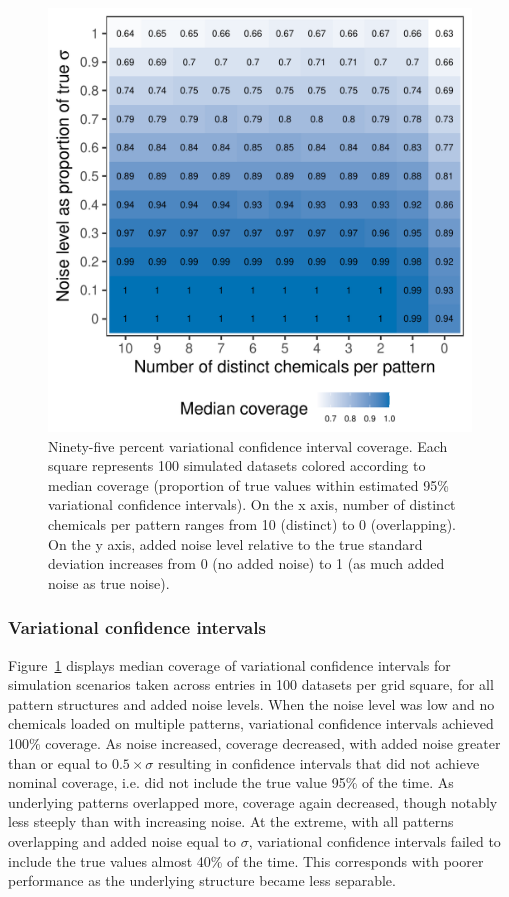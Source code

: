 \begin{figure}[!htbp]
\caption[Variational confidence interval coverage]{Ninety-five percent variational confidence interval coverage. Each square represents 100 simulated datasets colored according to median coverage (proportion of true values within estimated 95\% variational confidence intervals). On the x axis, number of distinct chemicals per pattern ranges from 10 (distinct) to 0 (overlapping). On the y axis, added noise level relative to the true standard deviation increases from 0 (no added noise) to 1 (as much added noise as true noise).}
\label{heatmap}
\centering
\includegraphics[scale = 0.7]{./figures/coverage_heat.pdf}
\end{figure}

\subsubsection{Variational confidence intervals}
Figure~\ref{heatmap} displays median coverage of variational confidence intervals for simulation scenarios taken across entries in 100 datasets per grid square, for all pattern structures and added noise levels. When the noise level was low and no chemicals loaded on multiple patterns, variational confidence intervals achieved 100\% coverage. As noise increased, coverage decreased, with added noise greater than or equal to $0.5 \times \sigma$ resulting in confidence intervals that did not achieve nominal coverage, i.e. did not include the true value 95\% of the time. As underlying patterns overlapped more, coverage again decreased, though notably less steeply than with increasing noise. At the extreme, with all patterns overlapping and added noise equal to $\sigma$, variational confidence intervals failed to include the true values almost 40\% of the time. This corresponds with poorer performance as the underlying structure became less separable. 

